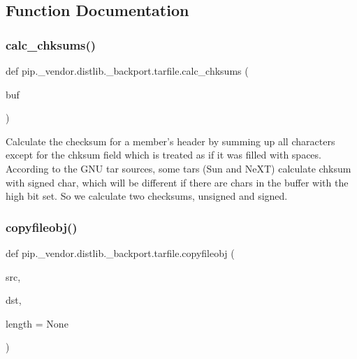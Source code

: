 \subsection{Function Documentation}
\mbox{\label{namespacepip_1_1__vendor_1_1distlib_1_1__backport_1_1tarfile_af4764bbf43b654ea491f86cfa0a5b906}} 
\subsubsection{\texorpdfstring{calc\+\_\+chksums()}{calc\_chksums()}}
{\footnotesize\ttfamily def pip.\+\_\+vendor.\+distlib.\+\_\+backport.\+tarfile.\+calc\+\_\+chksums (\begin{DoxyParamCaption}\item[{}]{buf }\end{DoxyParamCaption})}

\begin{DoxyVerb}Calculate the checksum for a member's header by summing up all
   characters except for the chksum field which is treated as if
   it was filled with spaces. According to the GNU tar sources,
   some tars (Sun and NeXT) calculate chksum with signed char,
   which will be different if there are chars in the buffer with
   the high bit set. So we calculate two checksums, unsigned and
   signed.
\end{DoxyVerb}
 \mbox{\label{namespacepip_1_1__vendor_1_1distlib_1_1__backport_1_1tarfile_a312ebc45af40f624a30a0538759d802a}} 
\subsubsection{\texorpdfstring{copyfileobj()}{copyfileobj()}}
{\footnotesize\ttfamily def pip.\+\_\+vendor.\+distlib.\+\_\+backport.\+tarfile.\+copyfileobj (\begin{DoxyParamCaption}\item[{}]{src,  }\item[{}]{dst,  }\item[{}]{length = {\ttfamily None} }\end{DoxyParamCaption})}

